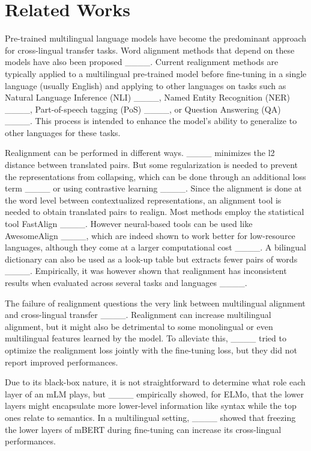 \section{Related Works}
Pre-trained multilingual language models have become the predominant approach for cross-lingual transfer tasks. Word alignment methods that depend on these models have also been proposed ____. Current realignment methods are typically applied to a multilingual pre-trained model before fine-tuning in a single language (usually English) and applying to other languages on tasks such as Natural Language Inference (NLI) ____, Named Entity Recognition (NER) ____, Part-of-speech tagging (PoS) ____, or Question Answering (QA) ____. This process is intended to enhance the model's ability to generalize to other languages for these tasks.


Realignment can be performed in different ways. ____ minimizes the l2 distance between translated pairs. But some regularization is needed to prevent the representations from collapsing, which can be done through an additional loss term ____
or using contrastive learning ____. Since the alignment is done at the word level between contextualized representations, an alignment tool is needed to obtain translated pairs to realign. Most methods employ the statistical tool FastAlign ____. However neural-based tools can be used like AwesomeAlign ____, which are indeed shown to work better for low-resource languages, although they come at a larger computational cost ____. A bilingual dictionary can also be used as a look-up table but extracts fewer pairs of words ____. Empirically, it was however shown that realignment has inconsistent results when evaluated across several tasks and languages ____.

The failure of realignment questions the very link between multilingual alignment and cross-lingual transfer ____. Realignment can increase multilingual alignment, but it might also be detrimental to some monolingual or even multilingual features learned by the model. To alleviate this, ____ tried to optimize the realignment loss jointly with the fine-tuning loss, but they did not report improved performances.

Due to its black-box nature, it is not straightforward to determine what role each layer of an mLM plays, but ____ empirically showed, for ELMo, that the lower layers might encapsulate more lower-level information like syntax while the top ones relate to semantics. In a multilingual setting, ____ showed that freezing the lower layers of mBERT during fine-tuning can increase its cross-lingual performances.